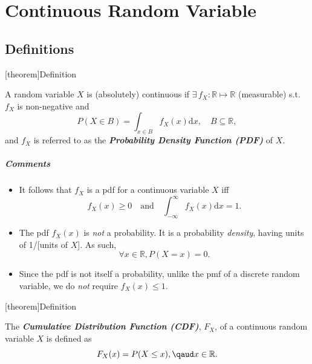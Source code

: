 \documentclass[12pt]{report}
\theoremstyle{definition}
\begin{document}
\chapter{Continuous Random Variable}

\section{Definitions}

[theorem]{Definition}
\begin{continuous RV}
    A random variable $X$ is (absolutely) continuous if $\exists\,
    f_X:\mathbb{R}\mapsto\mathbb{R}$ (measurable) s.t. $f_X$ is non-negative
    and
    \[
        P(X\in B)=\int_{x\in B}f_X(x)\mathrm{d}x,\quad
        B\subseteq \mathbb{R},
    \]
    and $f_X$ is referred to as the \textbf{\emph{Probability Density Function
    (PDF)}} of $X$.
\end{continuous RV}
\paragraph{Comments}
\begin{itemize}
    \item It follows that $f_X$ is a pdf for a continuous variable $X$ iff
        \[
            f_X(x)\ge 0\quad\text{and}\quad 
            \int_{-\infty}^{\infty} f_X(x)\mathrm{d}x=1.
        \]
    \item 
        The pdf $f_X(x)$ is \emph{not} a probability. It is a probability
        \emph{density}, having units of 1/[units of $X$].
        As such, 
        \[
            \forall x\in\mathbb{R}, P(X=x)=0.
        \]
    \item 
        Since the pdf is not itself a probability, unlike the pmf of a discrete
        random variable, we do \emph{not} require $f_X(x)\le 1$.
\end{itemize} 

[theorem]{Definition}
\begin{continuous cdf}
    The \textbf{\emph{Cumulative Distribution Function (CDF)}}, $F_X$, of a
    continuous random variable $X$ is defined as
    \[
        F_X(x)=P(X\le x),\qaud x\in\mathbb{R}.
    \]
\end{continuous cdf}
\end{document}
